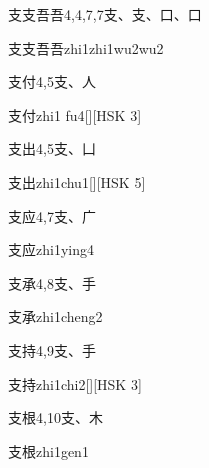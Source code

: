 \begin{entry}{支支吾吾}{4,4,7,7}{⽀、⽀、⼝、⼝}
  \begin{phonetics}{支支吾吾}{zhi1zhi1wu2wu2}
  \end{phonetics}
\end{entry}

\begin{entry}{支付}{4,5}{⽀、⼈}
  \begin{phonetics}{支付}{zhi1 fu4}[][HSK 3]
  \end{phonetics}
\end{entry}

\begin{entry}{支出}{4,5}{⽀、⼐}
  \begin{phonetics}{支出}{zhi1chu1}[][HSK 5]
  \end{phonetics}
\end{entry}

\begin{entry}{支应}{4,7}{⽀、⼴}
  \begin{phonetics}{支应}{zhi1ying4}
  \end{phonetics}
\end{entry}

\begin{entry}{支承}{4,8}{⽀、⼿}
  \begin{phonetics}{支承}{zhi1cheng2}
  \end{phonetics}
\end{entry}

\begin{entry}{支持}{4,9}{⽀、⼿}
  \begin{phonetics}{支持}{zhi1chi2}[][HSK 3]
  \end{phonetics}
\end{entry}

\begin{entry}{支根}{4,10}{⽀、⽊}
  \begin{phonetics}{支根}{zhi1gen1}
  \end{phonetics}
\end{entry}

